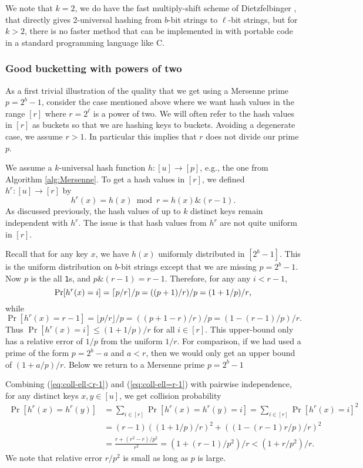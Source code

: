 \documentclass[12pt]{article}
\newcommand{\req}[1]{(\ref{#1})}
\newcommand\fct\rightarrow
\begin{document}
We note that $k=2$, we do have the fast multiply-shift scheme of Dietzfelbinger
\cite{dietzfel96universal}, that directly gives 2-universal
hashing from $b$-bit strings to $\ell$-bit strings, but for $k>2$,
there is no faster method that can be implemented in with portable code
in a standard programming language like C.




\subsubsection{Good bucketting with powers of two}\label{sec:power-of-two}
As a first trivial illustration of the quality that we get using a
Mersenne prime $p=2^b-1$, consider the case mentioned above where we
want hash values in the range $[r]$ where $r=2^\ell$ is a power of
two. We will often refer to the hash values in $[r]$ as buckets so
that we are hashing keys to buckets. Avoiding a degenerate case, we
assume $r>1$. In particular this implies that $r$ does not divide our
prime $p$.

We assume a $k$-universal hash function $h:[u]\fct[p]$, e.g.,
the one from Algorithm \ref{alg:Mersenne}. To get a hash values in $[r]$,
we defined $h^r:[u]\fct[r]$ by
\[h^r(x)=h(x)\bmod r=h(x)\texttt \& (r-1).\]
As discussed previously, the hash values of up to $k$ distinct keys remain
independent with $h^r$. The issue is that hash values from 
$h^r$ are not quite uniform in $[r]$.

Recall that for any key $x$, we have $h(x)$ uniformly distributed in $[2^b-1]$.
This is the uniform distribution on $b$-bit strings except that we are
missing $p=2^b-1$. Now $p$ is the all \texttt{1}s, and 
$p\texttt \& (r-1)=r-1$. Therefore, for any 
any $i<r-1$,
\begin{equation}\label{eq:coll-ell<r-1}
\Pr[h^r(x)=i]=\lceil p/r\rceil/p=((p+1)/r)/p
=(1+1/p)/r\textnormal,
\end{equation}
while 
\begin{equation}\label{eq:coll-ell=r-1}
 \Pr[h^r(x)=r-1]=\lfloor p/r\rfloor/p=((p+1-r)/r)/p
=(1-(r-1)/p)/r.
\end{equation}
Thus $\Pr[h^r(x)=i]\leq (1+1/p)/r$ for all $i\in[r]$. This upper-bound
only has a relative error of $1/p$ from the uniform $1/r$. For
comparison, if we had used a prime of the form $p=2^b-a$ and $a<r$, then
we would only get an upper bound of $(1+a/p)/r$. Below we return
to a Mersenne prime $p=2^b-1$

Combining \req{eq:coll-ell<r-1} and \req{eq:coll-ell=r-1} with
pairwise independence, for any distinct keys $x,y\in [u]$, we get
collision probability
\begin{align}
  \Pr[h^r(x)=h^r(y)]&=\sum_{i\in[r]}\Pr[h^r(x)=h^r(y)=i]=\sum_{i\in[r]}\Pr[h^r(x)=i]^2\nonumber\\
                   &=(r-1)((1+1/p)/r)^2+((1-(r-1)r/p)/r)^2\nonumber\\[.5ex]
  &=\frac{r +(r^2-r)/p^2}{r^2}=(1+(r-1)/p^2)/r<(1+r/p^2)/r.\label{eq:coll}
  \end{align}
We note that relative error $r/p^2$ is small as long as $p$ is
large.
\end{document}
